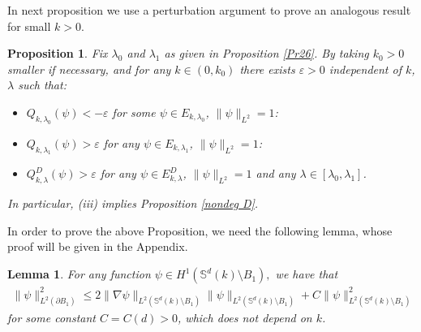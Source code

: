 \documentclass[reqno]{amsart}
\newtheorem{lemma}[theorem]{Lemma}
\newtheorem{proposition}[theorem]{Proposition}
\def\e{\varepsilon}
\numberwithin{equation}{section}
\newenvironment{key words}{\textbf{Keywords}\mbox{  }}{ }
\begin{document}
In next proposition we use a perturbation argument to prove an analogous result for small $k>0$.
\begin{proposition} \label{Pr25} Fix $\lambda_0$ and $\lambda_1$ as given in Proposition \ref{Pr26}. By taking $k_0>0$ smaller if necessary, and for any $k \in (0, k_0)$ there exists $\e>0$ independent of $k$, $\lambda$ such that:
\begin{itemize}
\item [(i)] $Q_{k, \lambda_{0}}(\psi)< -\e $ for some $\psi\in E_{k, \lambda_0}$, $\| \psi \|_{L^2} =1$:
 \item [(ii)] $Q_{k, \lambda_{1}}(\psi)> \e$ for any $\psi\in E_{k, \lambda_1}$,  $\| \psi \|_{L^2} =1$:
 \item [(iii)] $Q_{k, \lambda}^D(\psi)> \e$ for any $\psi\in E^D_{k, \lambda}$, $\| \psi \|_{L^2} =1$ and any $\lambda\in[\lambda_{0},\lambda_{1}]$.

  \end{itemize}

In particular, (iii) implies Proposition \ref{nondeg D}.
\end{proposition}
In order to prove the above Proposition, we need the following lemma, whose proof will be given in the Appendix.
 \begin{lemma} \label{Le32} For any function $\psi\in H^{1}(\mathbb{S}^{d}(k)\setminus B_{1}),$ we have that
  \begin{align*}
 \|\psi\|^{2}_{L^{2}(\partial B_{1})}\leq 2\|\nabla \psi\|_{L^{2}(\mathbb{S}^{d}(k)\setminus B_{1})}\|\psi\|_{L^{2}(\mathbb{S}^{d}(k)\setminus B_{1})}+C\|\psi\|^{2}_{L^{2}(\mathbb{S}^{d}(k)\setminus B_{1})}
\end{align*}
for some constant $C=C(d)>0$, which does not depend on $k$.
 \end{lemma}

\medskip
\end{document}
